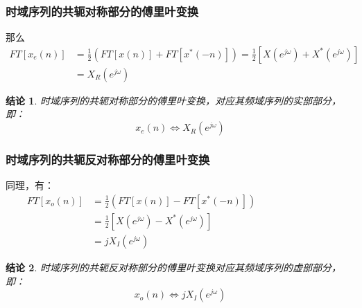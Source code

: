 \documentclass[notheorems,compress,mathserif,table]{beamer}
\newtheorem{jielun}{结论}
\begin{document}
\begin{frame}[shrink]\frametitle{时域序列的共轭对称部分的傅里叶变换}%
那么
\begin{equation*}
\begin{split}
FT[x_{e}(n)] &= \frac{1}{2}(FT[x(n)] + FT[x^{*}(-n)])
= \frac{1}{2}\left[X(e^{j\omega}) + X^{*}(e^{j\omega})\right] \\
&= X_{R}(e^{j\omega}) %
\end{split}
\end{equation*}


\begin{jielun}
时域序列的共轭对称部分的傅里叶变换，对应其频域序列的实部部分，即：
$$x_{e}(n) \Longleftrightarrow X_{R}(e^{j\omega})$$
\end{jielun}
\end{frame}





\begin{frame}[shrink]\frametitle{时域序列的共轭反对称部分的傅里叶变换}%


同理，有：
\begin{equation*}
\begin{split}
FT[x_{o}(n)] &= \frac{1}{2}(FT[x(n)] - FT[x^{*}(-n)])\qquad\qquad\qquad\qquad \\
&= \frac{1}{2}\left[X(e^{j\omega}) - X^{*}(e^{j\omega})\right] \\
&= jX_{I}(e^{j\omega}) %
\end{split}
\end{equation*}
\begin{jielun}
时域序列的共轭反对称部分的傅里叶变换对应其频域序列的虚部部分，即：
$$x_{o}(n) \Longleftrightarrow jX_{I}(e^{j\omega})$$
\end{jielun}
\end{frame}
\end{document}
